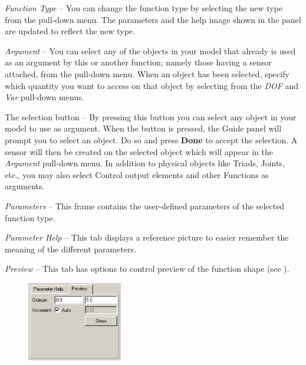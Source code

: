 \begin{bulletlist}
\item{\sl Function Type} -- You can
  change the function type by selecting the new type from the pull-down menu.
  The parameters and the help image shown in the panel are updated to reflect
  the new type.

\item{\sl Argument} --
  You can select any of the objects in your model that
  already is used as an argument by this or another function; namely
  those having a sensor attached, from the pull-down menu. When an object
  has been selected, specify which
  quantity you want to access on that object by selecting from the
  {\sl DOF} and {\sl Var} pull-down menus.

\item The selection button -- By pressing this button
  you can select any object in your model to use as argument.
  When the button is pressed, the Guide panel will prompt you to select an
  object. Do so and press \textbf{Done} to accept the selection.
  A sensor will then be created on the selected object which will appear in the
  {\sl Argument} pull-down menu. In addition to physical objects like Triads,
  Joints, etc., you may also select Control output elements and other Functions
  as arguments.

\item{\sl Parameters} --
  This frame contains the user-defined parameters of the selected function type.

\item{\sl Parameter Help} --
  This tab displays a reference picture to easier remember the meaning of
  the different parameters.

\item{\sl Preview} --
  This tab has options to control preview of the function shape
  (see ).
\end{bulletlist}



\begin{figure}
  \vspace{-4mm}
  \includegraphics[width=0.37\textwidth]{Figures/4-FunctionPreviewTab}
\end{figure}

